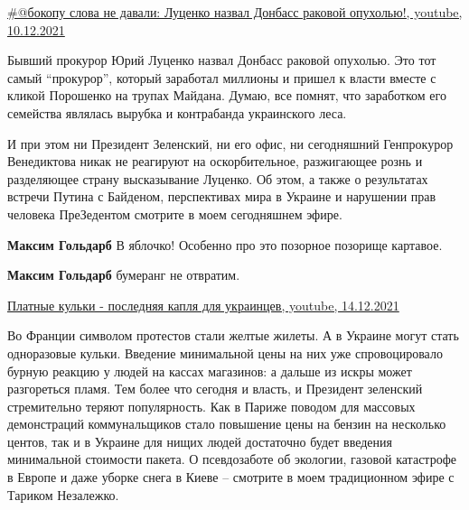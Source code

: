 \begin{itemize}

\href{https://youtu.be/pl0Ran6XglM}{%
\#@бокопу слова не давали: Луценко назвал Донбасс раковой опухолью!, youtube, %
10.12.2021%
}

\begin{multicols}{2} %

Бывший прокурор Юрий Луценко назвал Донбасс раковой опухолью. Это тот самый
\enquote{прокурор}, который заработал миллионы и пришел к власти вместе с
кликой Порошенко на трупах Майдана. Думаю, все помнят, что заработком его
семейства являлась вырубка и контрабанда украинского леса. 

И при этом ни Президент Зеленский, ни его офис, ни сегодняшний Генпрокурор
Венедиктова никак не реагируют на оскорбительное, разжигающее рознь и
разделяющее страну высказывание Луценко. Об этом, а также о результатах встречи
Путина с Байденом, перспективах мира в Украине и нарушении прав человека
ПреЗедентом смотрите в моем сегодняшнем эфире.

\end{multicols} %

\begin{itemize} %
\textbf{Максим Гольдарб} В яблочко! Особенно про это позорное позорище картавое.

\textbf{Максим Гольдарб} бумеранг не отвратим.
\end{itemize} %


\href{https://youtu.be/W4u4nQvug3U}{%
Платные кульки - последняя капля для украинцев, youtube, 14.12.2021%
}

\begin{multicols}{2} %
Во Франции символом протестов стали желтые жилеты. А в Украине могут стать
одноразовые кульки. Введение минимальной цены на них уже спровоцировало бурную
реакцию у людей на кассах магазинов: а дальше из искры может разгореться пламя.
Тем более что сегодня и власть, и Президент зеленский стремительно теряют
популярность. Как в Париже поводом для массовых демонстраций коммунальщиков
стало повышение цены на бензин на несколько центов, так и в Украине для нищих
людей достаточно будет введения минимальной стоимости пакета. О псевдозаботе об
экологии, газовой катастрофе в Европе и даже уборке снега в Киеве – смотрите в
моем традиционном эфире с Тариком Незалежко.
\end{multicols} %

\end{itemize} %
